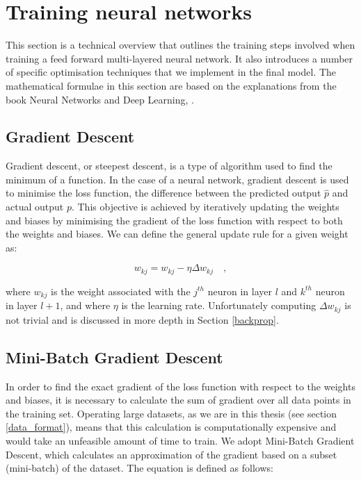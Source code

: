 
        
    \section{Training neural networks}
        This section is a technical overview that outlines the training steps involved when training a feed forward multi-layered neural network. It also introduces a number of specific optimisation techniques that we implement in the final model. The mathematical formulae in this section are based on the explanations from the book Neural Networks and Deep Learning, \cite{book_king_NN}.
    
        \subsection{Gradient Descent} \label{gradient_descent}
            Gradient descent, or steepest descent, is a type of algorithm used to find the minimum of a function. In the case of a neural network, gradient descent is used to minimise the loss function, the difference between the predicted output $\hat{p}$ and actual output $p$. 
            This objective is achieved by iteratively updating the weights and biases by minimising the gradient of the loss function with respect to both the weights and biases. We can define the general update rule for a given weight as:
            
            \begin{equation} \label{update_rule}
                w_{kj} = w_{kj} - \eta \Delta w_{kj} \quad ,
            \end{equation}
            
            where $w_{kj}$ is the weight associated with the $j^{th}$ neuron in layer $l$ and $k^{th}$ neuron in layer $l + 1$, and where $\eta$ is the learning rate. Unfortunately computing $ \Delta w_{kj}$ is not trivial and is discussed in more depth in Section \ref{backprop}.
            
        \subsection{Mini-Batch Gradient Descent} \label{mini_batch}
            In order to find the exact gradient of the loss function with respect to the weights and biases, it is necessary to calculate the sum of gradient over all data points in the training set. Operating large datasets, as we are in this thesis (see section \ref{data_format}), means that this calculation is computationally expensive and would take an unfeasible amount of time to train. We adopt Mini-Batch Gradient Descent, which calculates an approximation of the gradient based on a subset (mini-batch) of the dataset. The equation is defined as follows:
            
